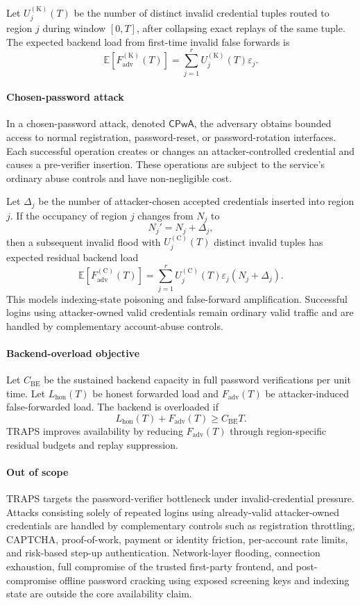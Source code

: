 Let \(U_j^{(\mathrm{K})}(T)\) be the number of distinct invalid credential tuples routed to region \(j\) during window \([0,T]\), after collapsing exact replays of the same tuple. The expected backend load from first-time invalid false forwards is
\[
\mathbb{E}
\left[
F_{\mathrm{adv}}^{(\mathrm{K})}(T)
\right]
=
\sum_{j=1}^{r}
U_j^{(\mathrm{K})}(T)\varepsilon_j.
\]

\paragraph{Chosen-password attack}
In a chosen-password attack, denoted \(\mathsf{CPwA}\), the adversary obtains bounded access to normal registration, password-reset, or password-rotation interfaces. Each successful operation creates or changes an attacker-controlled credential and causes a pre-verifier insertion. These operations are subject to the service's ordinary abuse controls and have non-negligible cost.

Let \(\Delta_j\) be the number of attacker-chosen accepted credentials inserted into region \(j\). If the occupancy of region \(j\) changes from \(N_j\) to
\[
N_j'=N_j+\Delta_j,
\]
then a subsequent invalid flood with \(U_j^{(\mathrm{C})}(T)\) distinct invalid tuples has expected residual backend load
\[
\mathbb{E}
\left[
F_{\mathrm{adv}}^{(\mathrm{C})}(T)
\right]
=
\sum_{j=1}^{r}
U_j^{(\mathrm{C})}(T)\varepsilon_j(N_j+\Delta_j).
\]
This models indexing-state poisoning and false-forward amplification. Successful logins using attacker-owned valid credentials remain ordinary valid traffic and are handled by complementary account-abuse controls.

\paragraph{Backend-overload objective}
Let \(C_{\mathrm{BE}}\) be the sustained backend capacity in full password verifications per unit time. Let \(L_{\mathrm{hon}}(T)\) be honest forwarded load and \(F_{\mathrm{adv}}(T)\) be attacker-induced false-forwarded load. The backend is overloaded if
\[
L_{\mathrm{hon}}(T)+F_{\mathrm{adv}}(T)\ge C_{\mathrm{BE}}T.
\]
TRAPS improves availability by reducing \(F_{\mathrm{adv}}(T)\) through region-specific residual budgets and replay suppression.

\paragraph{Out of scope}
TRAPS targets the password-verifier bottleneck under invalid-credential pressure. Attacks consisting solely of repeated logins using already-valid attacker-owned credentials are handled by complementary controls such as registration throttling, CAPTCHA, proof-of-work, payment or identity friction, per-account rate limits, and risk-based step-up authentication. Network-layer flooding, connection exhaustion, full compromise of the trusted first-party frontend, and post-compromise offline password cracking using exposed screening keys and indexing state are outside the core availability claim.

